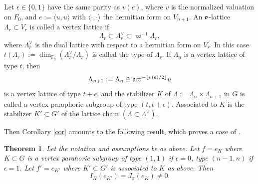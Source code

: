 \documentclass[11pt, a4paper]{amsart}
\theoremstyle{plain}
\theoremstyle{plain}
\theoremstyle{plain}
\newtheorem{thml}[lem]{Theorem}
\theoremstyle{plain}
\theoremstyle{remark}
\theoremstyle{definition}
\theoremstyle{plain}
\numberwithin{equation}{section}
\begin{document}
Let $\epsilon\in \{0,1\}$ have the same parity as $v(e)$, where $v$ is the normalized valuation on $F_0$, and $e:=\langle u, u\rangle$ with $\langle\cdot,\cdot\rangle$ the hermitian form on $V_{n+1}$. 
An $\frak o$-lattice $\Lambda_r\subset V_r$ is called a vertex lattice if 
\[
\Lambda_r \subset \Lambda_r^\vee \subset \varpi^{-1}\Lambda_r,
\]
where $\Lambda_r^\vee$ is the dual lattice with respect to a hermitian form on $V_r$. In this case $t(\Lambda_r):=\dim_{\mathbb{F}_q}(\Lambda_r^\vee/ \Lambda_r)$ is called the type of $\Lambda_r$. 
If $\Lambda_n$ is a vertex lattice of type $t$, then 
\[
\Lambda_{n+1}: = \Lambda_n\oplus \frak o \varpi^{-\lfloor v(e)/2\rfloor} u
\]
is a vertex lattice of type $t+\epsilon$, and the stabilizer $K$ of $\Lambda:=\Lambda_n\times \Lambda_{n+1}$ in $G$ is called a vertex paraphoric subgroup of type $(t, t+\epsilon)$. 
Associated to $K$ is the stabilizer $K' \subset G'$ of the lattice chain $(\Lambda \subset \Lambda^\vee)$. 

Then Corollary \ref{cor} amounts to the following result, which proves a case of \cite[Conjecture 3.6.10]{DZ}.

\begin{thml}\label{DZ}
Let the notation and assumptions be as above. Let $f= e_K$ where $K\subset G$ is a vertex parahoric subgroup of type $(1,1)$ if $\epsilon=0$, type $(n-1, n)$ if  $\epsilon =1$. 
Let $f' = e_{K'}$ where $K'\subset G'$ is associated to $K$ as above. Then 
\[
I_\Pi(e_{K'}) = J_\pi(e_K)\neq 0.
\]
\end{thml}
\end{document}
